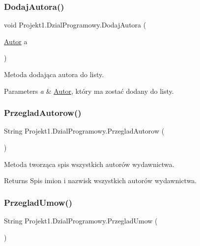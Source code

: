 \subsubsection{\texorpdfstring{DodajAutora()}{DodajAutora()}}
{\footnotesize\ttfamily void Projekt1.\+Dzial\+Programowy.\+Dodaj\+Autora (\begin{DoxyParamCaption}\item[{\mbox{\hyperlink{class_projekt1_1_1_autor}{Autor}}}]{a }\end{DoxyParamCaption})}



Metoda dodająca autora do listy. 


\begin{DoxyParams}{Parameters}
{\em a} & \mbox{\hyperlink{class_projekt1_1_1_autor}{Autor}}, który ma zostać dodany do listy.\\
\hline
\end{DoxyParams}
\mbox{\label{class_projekt1_1_1_dzial_programowy_aa6a32f8a0d11777efb667ec30b6d0441}} 
\subsubsection{\texorpdfstring{PrzegladAutorow()}{PrzegladAutorow()}}
{\footnotesize\ttfamily String Projekt1.\+Dzial\+Programowy.\+Przeglad\+Autorow (\begin{DoxyParamCaption}{ }\end{DoxyParamCaption})}



Metoda tworząca spis wszystkich autorów wydawnictwa. 

\begin{DoxyReturn}{Returns}
Spis imion i nazwisk wszystkich autorów wydawnictwa. 
\end{DoxyReturn}
\mbox{\label{class_projekt1_1_1_dzial_programowy_ace0526308526f95c29cc53060ea08b4a}} 
\subsubsection{\texorpdfstring{PrzegladUmow()}{PrzegladUmow()}}
{\footnotesize\ttfamily String Projekt1.\+Dzial\+Programowy.\+Przeglad\+Umow (\begin{DoxyParamCaption}{ }\end{DoxyParamCaption})}



